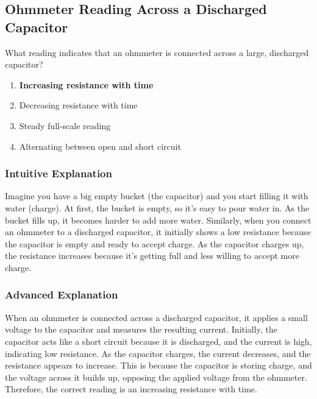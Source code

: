 \subsection{Ohmmeter Reading Across a Discharged Capacitor}
\label{T7D10}

\begin{tcolorbox}[colback=gray!10!white,colframe=black!75!black,title=T7D10]
What reading indicates that an ohmmeter is connected across a large, discharged capacitor?
\begin{enumerate}[noitemsep]
    \item \textbf{Increasing resistance with time}
    \item Decreasing resistance with time
    \item Steady full-scale reading
    \item Alternating between open and short circuit
\end{enumerate}
\end{tcolorbox}

\subsubsection*{Intuitive Explanation}
Imagine you have a big empty bucket (the capacitor) and you start filling it with water (charge). At first, the bucket is empty, so it’s easy to pour water in. As the bucket fills up, it becomes harder to add more water. Similarly, when you connect an ohmmeter to a discharged capacitor, it initially shows a low resistance because the capacitor is empty and ready to accept charge. As the capacitor charges up, the resistance increases because it’s getting full and less willing to accept more charge.

\subsubsection*{Advanced Explanation}
When an ohmmeter is connected across a discharged capacitor, it applies a small voltage to the capacitor and measures the resulting current. Initially, the capacitor acts like a short circuit because it is discharged, and the current is high, indicating low resistance. As the capacitor charges, the current decreases, and the resistance appears to increase. This is because the capacitor is storing charge, and the voltage across it builds up, opposing the applied voltage from the ohmmeter. Therefore, the correct reading is an increasing resistance with time.

